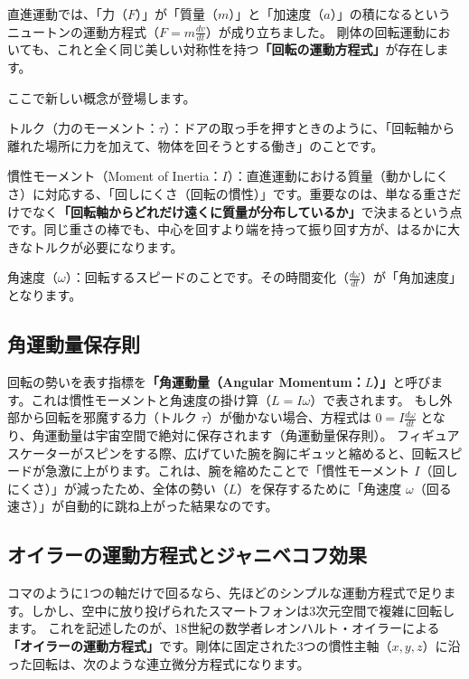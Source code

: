直進運動では、「力（\(F\)）」が「質量（\(m\)）」と「加速度（\(a\)）」の積になるというニュートンの運動方程式（\(F = m\frac{dv}{dt}\)）が成り立ちました。 剛体の回転運動においても、これと全く同じ美しい対称性を持つ\textbf{「回転の運動方程式」}が存在します。

ここで新しい概念が登場します。

トルク（力のモーメント：\ensuremath{\tau}）：ドアの取っ手を押すときのように、「回転軸から離れた場所に力を加えて、物体を回そうとする働き」のことです。

慣性モーメント（Moment of Inertia：\(I\)）：直進運動における質量（動かしにくさ）に対応する、「回しにくさ（回転の慣性）」です。重要なのは、単なる重さだけでなく\textbf{「回転軸からどれだけ遠くに質量が分布しているか」}で決まるという点です。同じ重さの棒でも、中心を回すより端を持って振り回す方が、はるかに大きなトルクが必要になります。

角速度（\ensuremath{\omega}）：回転するスピードのことです。その時間変化（\ensuremath{\frac{d\omega}{dt}}）が「角加速度」となります。

\subsection{角運動量保存則}

回転の勢いを表す指標を\textbf{「角運動量（Angular Momentum：\(L\)）」}と呼びます。これは慣性モーメントと角速度の掛け算（\(L = I\omega\)）で表されます。 もし外部から回転を邪魔する力（トルク \ensuremath{\tau}）が働かない場合、方程式は \(0 = I\frac{d\omega}{dt}\) となり、角運動量は宇宙空間で絶対に保存されます（角運動量保存則）。 フィギュアスケーターがスピンをする際、広げていた腕を胸にギュッと縮めると、回転スピードが急激に上がります。これは、腕を縮めたことで「慣性モーメント \(I\)（回しにくさ）」が減ったため、全体の勢い（\(L\)）を保存するために「角速度 \ensuremath{\omega}（回る速さ）」が自動的に跳ね上がった結果なのです。

\subsection{オイラーの運動方程式とジャニベコフ効果}

コマのように1つの軸だけで回るなら、先ほどのシンプルな運動方程式で足ります。しかし、空中に放り投げられたスマートフォンは3次元空間で複雑に回転します。 これを記述したのが、18世紀の数学者レオンハルト・オイラーによる\textbf{「オイラーの運動方程式」}です。剛体に固定された3つの慣性主軸（\(x, y, z\)）に沿った回転は、次のような連立微分方程式になります。

